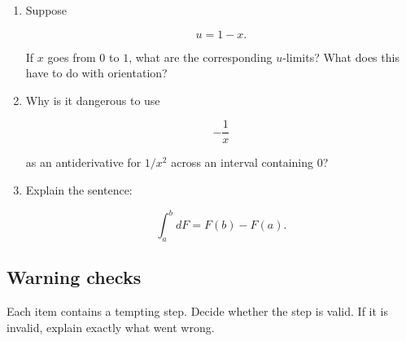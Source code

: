 \begin{enumerate}
\[
u=x^2.
\]

If \(x\) goes from \(1\) to \(3\), what are the corresponding \(u\)-limits?

\item Suppose

\[
u=1-x.
\]

If \(x\) goes from \(0\) to \(1\), what are the corresponding \(u\)-limits?  What does
this have to do with orientation?

\item Why is it dangerous to use

\[
-\frac1x
\]

as an antiderivative for \(1/x^2\) across an interval containing \(0\)?

\item Explain the sentence:

\[
\int_a^b dF=F(b)-F(a).
\]

\end{enumerate}

\subsection{Warning checks}
\label{subsec:chapter9-warning-checks}

Each item contains a tempting step.  Decide whether the step is valid.  If it is invalid,
explain exactly what went wrong.

